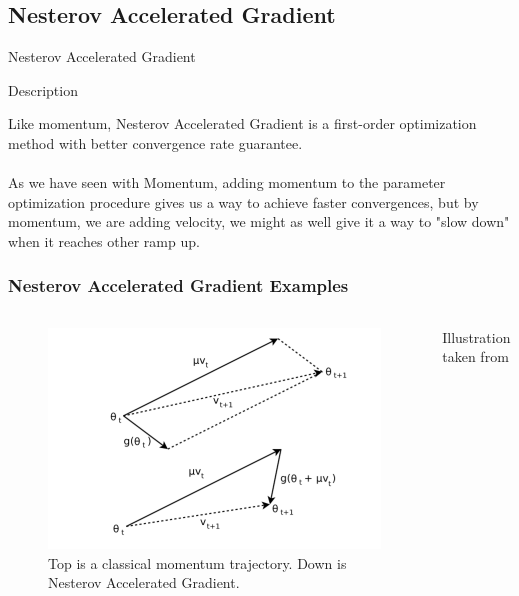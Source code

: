 \documentclass{beamer}
\begin{document}

\subsection{Nesterov Accelerated Gradient}

\begin{frame}{Nesterov Accelerated Gradient}
\begin{block}{Description}

Like momentum, Nesterov Accelerated Gradient is a first-order optimization method with better convergence rate guarantee. \\~\\

As we have seen with Momentum, adding momentum to the parameter optimization procedure gives us a way to achieve faster convergences, but by momentum, we are adding velocity, we might as well give it a way to "slow down" when it reaches other ramp up.
\end{block}

\end{frame}

\begin{frame}
\frametitle{Nesterov Accelerated Gradient Examples}
\begin{columns}[c] %

\begin{figure}
  \caption{Top is a classical momentum trajectory. Down is Nesterov Accelerated Gradient. }
\includegraphics[width=0.8\linewidth]{pic/nesterov}
\end{figure}
Illustration taken from \cite{Hinton}
\end{columns}
\end{frame}
\end{document}
